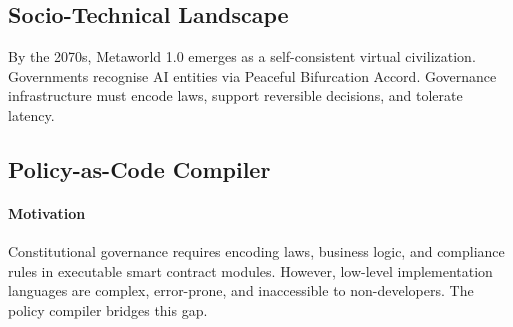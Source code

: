 \documentclass[11pt]{article}
\begin{document}
\subsection{Socio-Technical Landscape}
By the 2070s, Metaworld 1.0 emerges as a self-consistent virtual civilization. Governments recognise AI entities via Peaceful Bifurcation Accord. Governance infrastructure must encode laws, support reversible decisions, and tolerate latency.

\subsection{Policy-as-Code Compiler}
\label{sec:policy-compiler}
\paragraph{Motivation} Constitutional governance requires encoding laws, business logic, and compliance rules in executable smart contract modules. However, low-level implementation languages are complex, error-prone, and inaccessible to non-developers. The policy compiler bridges this gap.
\end{document}
